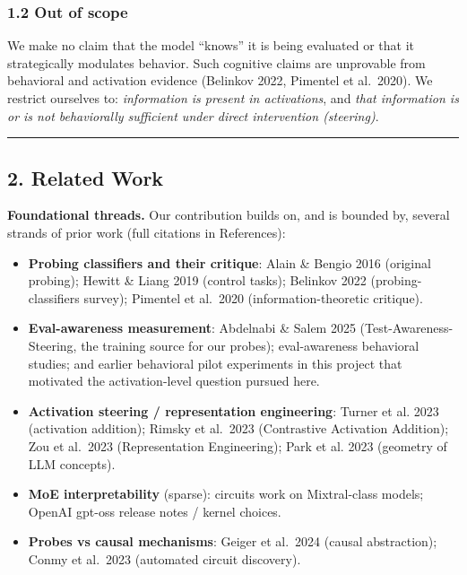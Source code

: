 \documentclass[
]{article}
\providecommand{\tightlist}{%
  \setlength{\itemsep}{0pt}\setlength{\parskip}{0pt}}
\begin{document}
\subsubsection{1.2 Out of scope}\label{out-of-scope}

We make no claim that the model ``knows'' it is being evaluated or that
it strategically modulates behavior. Such cognitive claims are
unprovable from behavioral and activation evidence (Belinkov 2022,
Pimentel et al.~2020). We restrict ourselves to: \emph{information is
present in activations}, and \emph{that information is or is not
behaviorally sufficient under direct intervention (steering)}.

\begin{center}\rule{0.5\linewidth}{0.5pt}\end{center}

\subsection{2. Related Work}\label{related-work}

\textbf{Foundational threads.} Our contribution builds on, and is
bounded by, several strands of prior work (full citations in
References):

\begin{itemize}
\tightlist
\item
  \textbf{Probing classifiers and their critique}: Alain \& Bengio 2016
  (original probing); Hewitt \& Liang 2019 (control tasks); Belinkov
  2022 (probing-classifiers survey); Pimentel et al.~2020
  (information-theoretic critique).
\item
  \textbf{Eval-awareness measurement}: Abdelnabi \& Salem 2025
  (Test-Awareness-Steering, the training source for our probes);
  eval-awareness behavioral studies; and earlier behavioral pilot
  experiments in this project that motivated the activation-level
  question pursued here.
\item
  \textbf{Activation steering / representation engineering}: Turner et
  al. 2023 (activation addition); Rimsky et al.~2023 (Contrastive
  Activation Addition); Zou et al.~2023 (Representation Engineering);
  Park et al. 2023 (geometry of LLM concepts).
\item
  \textbf{MoE interpretability} (sparse): circuits work on Mixtral-class
  models; OpenAI gpt-oss release notes / kernel choices.
\item
  \textbf{Probes vs causal mechanisms}: Geiger et al.~2024 (causal
  abstraction); Conmy et al.~2023 (automated circuit discovery).
\end{itemize}
\end{document}
